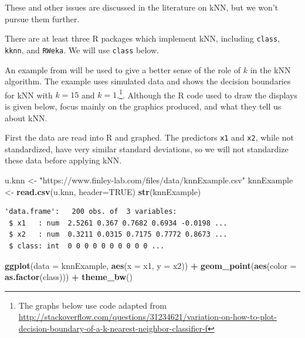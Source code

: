 \documentclass[
]{krantz}
\makeatletter
\newenvironment{Shaded}{\begin{snugshade}}{\end{snugshade}}
\newcommand{\DataTypeTok}[1]{\textcolor[rgb]{0.27,0.27,0.27}{#1}}
\newcommand{\KeywordTok}[1]{\textcolor[rgb]{0.27,0.27,0.27}{\textbf{#1}}}
\newcommand{\NormalTok}[1]{#1}
\newcommand{\OperatorTok}[1]{\textcolor[rgb]{0.43,0.43,0.43}{\textbf{#1}}}
\newcommand{\OtherTok}[1]{\textcolor[rgb]{0.37,0.37,0.37}{#1}}
\newcommand{\StringTok}[1]{\textcolor[rgb]{0.5,0.5,0.5}{#1}}
\newenvironment{kframe}{%
\medskip{}
\setlength{\fboxsep}{.8em}
 \def\at@end@of@kframe{}%
 \ifinner\ifhmode%
  \def\at@end@of@kframe{\end{minipage}}%
  \begin{minipage}{\columnwidth}%
 \fi\fi%
 \def\FrameCommand##1{\hskip\@totalleftmargin \hskip-\fboxsep
 \colorbox{shadecolor}{##1}\hskip-\fboxsep
     \hskip-\linewidth \hskip-\@totalleftmargin \hskip\columnwidth}%
 \MakeFramed {\advance\hsize-\width
   \@totalleftmargin\z@ \linewidth\hsize
   \@setminipage}}%
 {\par\unskip\endMakeFramed%
 \at@end@of@kframe}
\renewenvironment{Shaded}{\begin{kframe}}{\end{kframe}}
\makeatother
\begin{document}
These and other issues are discussed in the literature on kNN, but we won't pursue them further.

There are at least three R packages which implement kNN, including \texttt{class}, \texttt{kknn}, and \texttt{RWeka}. We will use \texttt{class} below.

An example from \citet{hastieESL} will be used to give a better sense of the role of \(k\) in the kNN algorithm. The example uses simulated data and shows the decision boundaries for kNN with \(k=15\) and \(k=1\).\footnote{The graphs below use code adapted from \url{http://stackoverflow.com/questions/31234621/variation-on-how-to-plot-decision-boundary-of-a-k-nearest-neighbor-classifier-f}}. Although the R code used to draw the displays is given below, focus mainly on the graphics produced, and what they tell us about kNN.

First the data are read into R and graphed. The predictors \texttt{x1} and \texttt{x2}, while not standardized, have very similar standard deviations, so we will not standardize these data before applying kNN.

\begin{Shaded}
\begin{Highlighting}[]
\NormalTok{u.knn \textless{}{-}}\StringTok{ "https://www.finley{-}lab.com/files/data/knnExample.csv"}
\NormalTok{knnExample \textless{}{-}}\StringTok{ }\KeywordTok{read.csv}\NormalTok{(u.knn, }\DataTypeTok{header=}\OtherTok{TRUE}\NormalTok{)}
\KeywordTok{str}\NormalTok{(knnExample)}
\end{Highlighting}
\end{Shaded}

\begin{verbatim}
'data.frame':	200 obs. of  3 variables:
 $ x1   : num  2.5261 0.367 0.7682 0.6934 -0.0198 ...
 $ x2   : num  0.3211 0.0315 0.7175 0.7772 0.8673 ...
 $ class: int  0 0 0 0 0 0 0 0 0 0 ...
\end{verbatim}

\begin{Shaded}
\begin{Highlighting}[]
\KeywordTok{ggplot}\NormalTok{(}\DataTypeTok{data =}\NormalTok{ knnExample, }\KeywordTok{aes}\NormalTok{(}\DataTypeTok{x =}\NormalTok{ x1, }\DataTypeTok{y =}\NormalTok{ x2)) }\OperatorTok{+}\StringTok{ }
\StringTok{   }\KeywordTok{geom\_point}\NormalTok{(}\KeywordTok{aes}\NormalTok{(}\DataTypeTok{color =} \KeywordTok{as.factor}\NormalTok{(class))) }\OperatorTok{+}
\StringTok{   }\KeywordTok{theme\_bw}\NormalTok{()}
\end{Highlighting}
\end{Shaded}
\end{document}
